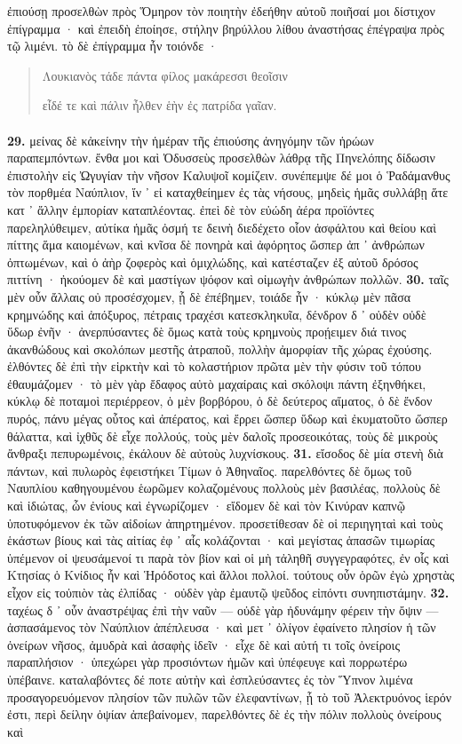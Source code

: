 \documentclass[a4paper, 11pt, oneside, polutonikogreek, german]{article}
\begin{document}
ἐπιούσῃ προσελθὼν πρὸς Ὅμηρον τὸν ποιητὴν ἐδεήθην αὐτοῦ ποιῆσαί μοι δίστιχον ἐπίγραμμα · καὶ ἐπειδὴ ἐποίησε, στήλην βηρύλλου λίθου ἀναστήσας ἐπέγραψα πρὸς τῷ λιμένι. τὸ δὲ ἐπίγραμμα ἦν τοιόνδε ·
\begin{quotation}
Λουκιανὸς τάδε πάντα φίλος μακάρεσσι θεοῖσιν

εἶδέ τε καὶ πάλιν ἦλθεν ἑὴν ἐς πατρίδα γαῖαν.
\end{quotation}
\paragraph{}
\textbf{29.} μείνας δὲ κἀκείνην τὴν ἡμέραν τῆς ἐπιούσης ἀνηγόμην τῶν ἡρώων παραπεμπόντων. ἔνθα μοι καὶ Ὀδυσσεὺς προσελθὼν λάθρᾳ τῆς Πηνελόπης δίδωσιν ἐπιστολὴν εἰς Ὠγυγίαν τὴν νῆσον Καλυψοῖ κομίζειν. συνέπεμψε δέ μοι ὁ Ῥαδάμανθυς τὸν πορθμέα Ναύπλιον, ἵν ᾽ εἰ καταχθείημεν ἐς τὰς νήσους, μηδεὶς ἡμᾶς συλλάβῃ ἅτε κατ ᾽ ἄλλην ἐμπορίαν καταπλέοντας. ἐπεὶ δὲ τὸν εὐώδη ἀέρα προϊόντες παρεληλύθειμεν, αὐτίκα ἡμᾶς ὀσμή τε δεινὴ διεδέχετο οἷον ἀσφάλτου καὶ θείου καὶ πίττης ἅμα καιομένων, καὶ κνῖσα δὲ πονηρὰ καὶ ἀφόρητος ὥσπερ ἀπ ᾽ ἀνθρώπων ὀπτωμένων, καὶ ὁ ἀὴρ ζοφερὸς καὶ ὁμιχλώδης, καὶ κατέσταζεν ἐξ αὐτοῦ δρόσος πιττίνη · ἠκούομεν δὲ καὶ μαστίγων ψόφον καὶ οἰμωγὴν ἀνθρώπων πολλῶν. \textbf{30.} ταῖς μὲν οὖν ἄλλαις οὐ προσέσχομεν, ᾗ δὲ ἐπέβημεν, τοιάδε ἦν · κύκλῳ μὲν πᾶσα κρημνώδης καὶ ἀπόξυρος, πέτραις τραχέσι κατεσκληκυῖα, δένδρον δ ᾽ οὐδὲν οὐδὲ ὕδωρ ἐνῆν · ἀνερπύσαντες δὲ ὅμως κατὰ τοὺς κρημνοὺς προῄειμεν διά τινος ἀκανθώδους καὶ σκολόπων μεστῆς ἀτραποῦ, πολλὴν ἀμορφίαν τῆς χώρας ἐχούσης. ἐλθόντες δὲ ἐπὶ τὴν εἱρκτὴν καὶ τὸ κολαστήριον πρῶτα μὲν τὴν φύσιν τοῦ τόπου ἐθαυμάζομεν · τὸ μὲν γὰρ ἔδαφος αὐτὸ μαχαίραις καὶ σκόλοψι πάντη ἐξηνθήκει, κύκλῳ δὲ ποταμοὶ περιέρρεον, ὁ μὲν βορβόρου, ὁ δὲ δεύτερος αἵματος, ὁ δὲ ἔνδον πυρός, πάνυ μέγας οὗτος καὶ ἀπέρατος, καὶ ἔρρει ὥσπερ ὕδωρ καὶ ἐκυματοῦτο ὥσπερ θάλαττα, καὶ ἰχθῦς δὲ εἶχε πολλούς, τοὺς μὲν δαλοῖς προσεοικότας, τοὺς δὲ μικροὺς ἄνθραξι πεπυρωμένοις, ἐκάλουν δὲ αὐτοὺς λυχνίσκους. \textbf{31.} εἴσοδος δὲ μία στενὴ διὰ πάντων, καὶ πυλωρὸς ἐφειστήκει Τίμων ὁ Ἀθηναῖος. παρελθόντες δὲ ὅμως τοῦ Ναυπλίου καθηγουμένου ἑωρῶμεν κολαζομένους πολλοὺς μὲν βασιλέας, πολλοὺς δὲ καὶ ἰδιώτας, ὧν ἐνίους καὶ ἐγνωρίζομεν · εἴδομεν δὲ καὶ τὸν Κινύραν καπνῷ ὑποτυφόμενον ἐκ τῶν αἰδοίων ἀπηρτημένον. προσετίθεσαν δὲ οἱ περιηγηταὶ καὶ τοὺς ἑκάστων βίους καὶ τὰς αἰτίας ἐφ ᾽ αἷς κολάζονται · καὶ μεγίστας ἁπασῶν τιμωρίας ὑπέμενον οἱ ψευσάμενοί τι παρὰ τὸν βίον καὶ οἱ μὴ τἀληθῆ συγγεγραφότες, ἐν οἷς καὶ Κτησίας ὁ Κνίδιος ἦν καὶ Ἡρόδοτος καὶ ἄλλοι πολλοί. τούτους οὖν ὁρῶν ἐγὼ χρηστὰς εἶχον εἰς τοὐπιὸν τὰς ἐλπίδας · οὐδὲν γὰρ ἐμαυτῷ ψεῦδος εἰπόντι συνηπιστάμην. \textbf{32.} ταχέως δ ᾽ οὖν ἀναστρέψας ἐπὶ τὴν ναῦν --- οὐδὲ γὰρ ἠδυνάμην φέρειν τὴν ὄψιν --- ἀσπασάμενος τὸν Ναύπλιον ἀπέπλευσα · καὶ μετ ᾽ ὀλίγον ἐφαίνετο πλησίον ἡ τῶν ὀνείρων νῆσος, ἀμυδρὰ καὶ ἀσαφὴς ἰδεῖν · εἶχε δὲ καὶ αὐτή τι τοῖς ὀνείροις παραπλήσιον · ὑπεχώρει γὰρ προσιόντων ἡμῶν καὶ ὑπέφευγε καὶ πορρωτέρω ὑπέβαινε. καταλαβόντες δέ ποτε αὐτὴν καὶ ἐσπλεύσαντες ἐς τὸν Ὕπνον λιμένα προσαγορευόμενον πλησίον τῶν πυλῶν τῶν ἐλεφαντίνων, ᾗ τὸ τοῦ Ἀλεκτρυόνος ἱερόν ἐστι, περὶ δείλην ὀψίαν ἀπεβαίνομεν, παρελθόντες δὲ ἐς τὴν πόλιν πολλοὺς ὀνείρους καὶ 
\end{document}
